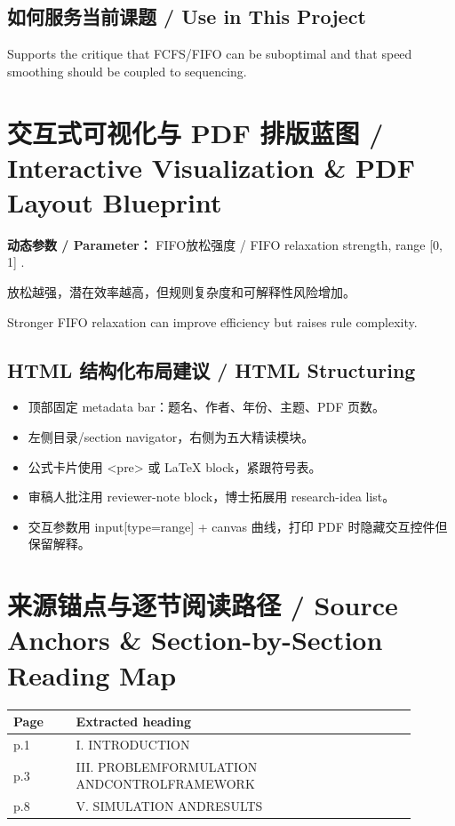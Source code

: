 \documentclass[UTF8,a4paper,11pt,fontset=fandol]{ctexart}
\begin{document}
\subsection{如何服务当前课题 / Use in This Project}
Supports the critique that FCFS/FIFO can be suboptimal and that speed smoothing should be coupled to sequencing.

\section{交互式可视化与 PDF 排版蓝图 / Interactive Visualization \& PDF Layout Blueprint}
\textbf{动态参数 / Parameter：} FIFO放松强度 / FIFO relaxation strength, range [0, 1] .

放松越强，潜在效率越高，但规则复杂度和可解释性风险增加。

Stronger FIFO relaxation can improve efficiency but raises rule complexity.

\subsection{HTML 结构化布局建议 / HTML Structuring}
\begin{itemize}
\item 顶部固定 metadata bar：题名、作者、年份、主题、PDF 页数。
\item 左侧目录/section navigator，右侧为五大精读模块。
\item 公式卡片使用 <pre> 或 LaTeX block，紧跟符号表。
\item 审稿人批注用 reviewer-note block，博士拓展用 research-idea list。
\item 交互参数用 input[type=range] + canvas 曲线，打印 PDF 时隐藏交互控件但保留解释。
\end{itemize}


\section{来源锚点与逐节阅读路径 / Source Anchors \& Section-by-Section Reading Map}
\begin{longtable}{p{0.14\linewidth}p{0.76\linewidth}}
\toprule
Page & Extracted heading\\
\midrule
p.1 & I. INTRODUCTION \\
p.3 & III. PROBLEMFORMULATION ANDCONTROLFRAMEWORK \\
p.8 & V. SIMULATION ANDRESULTS \\
\bottomrule
\end{longtable}
\end{document}
